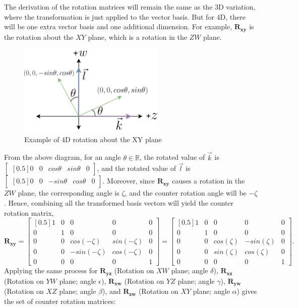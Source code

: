\documentclass[12pt, letterpaper]{article}
\begin{document}
The derivation of the rotation matrices will remain the same as the 3D variation, where the transformation is just applied to the vector basis. But for 4D, there will be one extra vector basis and one additional dimension. For example, $\mathbf{R_{xy}}$ is the rotation about the $XY$ plane, which is a rotation in the $ZW$ plane.
\begin{figure}[H]
\centering
\includegraphics[width=7cm]{rotation_4d_example.png}
\caption{Example of 4D rotation about the XY plane}
\label{fig:figure}
\end{figure}
From the above diagram, for an angle $\theta \in \mathbb{R}$, the rotated value of $\vec{k}$ is $\begin{bmatrix}[0.5]0 & 0 & cos\theta & sin\theta & 0\end{bmatrix}$, and the rotated value of  $\vec{l}$  is $\begin{bmatrix}[0.5]0 & 0 & -sin\theta & cos\theta & 0\end{bmatrix}$. Moreover, since $\mathbf{R_{xy}}$ causes a rotation in the $ZW$ plane, the corresponding angle is $\zeta$, and the counter rotation angle will be $-\zeta$. Hence, combining all the transformed basis vectors will yield the counter rotation matrix, 
$$\mathbf{R_{xy}} = \begin{bmatrix}[0.5] 1 & 0 & 0 & 0 & 0 \\ 0 & 1 & 0 & 0 & 0\\ 0 & 0 & cos(-\zeta) & sin(-\zeta) & 0\\ 0 & 0 & -sin(-\zeta) & cos(-\zeta) & 0\\ 0 & 0 & 0 & 0 & 1\end{bmatrix} = \begin{bmatrix}[0.5] 1 & 0 & 0 & 0 & 0 \\ 0 & 1 & 0 & 0 & 0\\ 0 & 0 & cos(\zeta) & -sin(\zeta) & 0\\ 0 & 0 & sin(\zeta) & cos(\zeta) & 0\\ 0 & 0 & 0 & 0 & 1\end{bmatrix}.$$
Applying the same process for $\mathbf{R_{yz}}$ (Rotation on $XW$ plane; angle $\delta$), $\mathbf{R_{xz}}$ (Rotation on $YW$ plane; angle $\epsilon$), $\mathbf{R_{xw}}$ (Rotation on $YZ$ plane; angle $\gamma$), $\mathbf{R_{yw}}$ (Rotation on $XZ$ plane; angle $\beta$), and $\mathbf{R_{zw}}$ (Rotation on $XY$ plane; angle $\alpha$) gives the set of counter rotation matrices:
\end{document}

